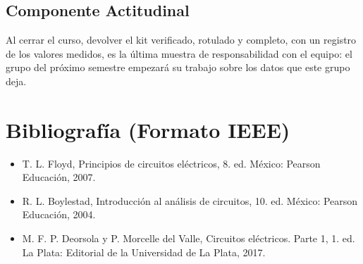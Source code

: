 \documentclass[11pt,letterpaper]{article}
\begin{document}
\subsection*{Componente Actitudinal}

\begin{cita}
Al cerrar el curso, devolver el kit verificado, rotulado y completo, con un registro de los valores medidos, es la última muestra de responsabilidad con el equipo: el grupo del próximo semestre empezará su trabajo sobre los datos que este grupo deja.
\end{cita}

\section{Bibliografía (Formato IEEE)}

{\sloppy
\begin{itemize}[leftmargin=2.6em, labelwidth=2.2em, labelsep=0.4em, align=left]
  \item[{[1]}] T. L. Floyd, Principios de circuitos eléctricos, 8.\textordfeminine{} ed. México: Pearson Educación, 2007.
  \item[{[2]}] R. L. Boylestad, Introducción al análisis de circuitos, 10.\textordfeminine{} ed. México: Pearson Educación, 2004.
  \item[{[3]}] M. F. P. Deorsola y P. Morcelle del Valle, Circuitos eléctricos. Parte 1, 1.\textordfeminine{} ed. La Plata: Editorial de la Universidad de La Plata, 2017.
\end{itemize}
}
\end{document}
